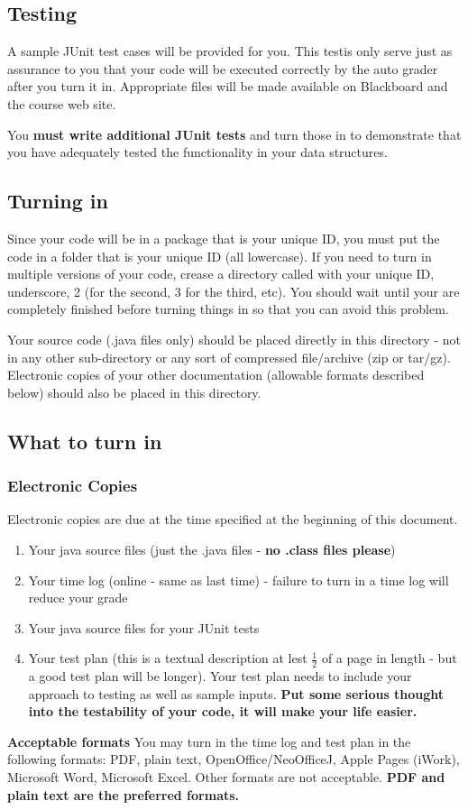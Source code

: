 \documentclass[11pt]{exam}
\begin{document}
\subsection*{Testing}
A sample JUnit test cases will be provided for you.   This testis only serve just as assurance to you that your code will be executed correctly by the auto grader after you turn it in.  Appropriate files will be made available on Blackboard and the course web site. 
\par
You {\bf must write additional JUnit tests} and turn those in to demonstrate that you have adequately tested the functionality in your data structures.

\subsection*{Turning in}
Since your code will be in a package that is your unique ID, you must put the code in a folder that is your unique ID (all lowercase).  If you need to turn in multiple versions of your code, crease a directory called with your unique ID, underscore, 2 (for the second, 3 for the third, etc).   You should wait until your are completely finished before turning things in so that you can avoid this problem.
\par
Your source code (.java files only) should be placed directly in this directory - not in any other sub-directory or any sort of compressed file/archive (zip or tar/gz).   Electronic copies of your other documentation (allowable formats described below) should also be placed in this directory.

\subsection*{What to turn in}
\subsubsection*{Electronic Copies}
Electronic copies are due at the time specified at the beginning of this document.
\begin{enumerate}
   \item Your java source files (just the .java files - {\bf no .class files please})
   \item Your time log (online - same as last time) - failure to turn in a time log will reduce your grade
   \item Your java source files for your JUnit tests
   \item Your test plan (this is a textual description at lest $\frac{1}{2}$ of a page in length - but a good test plan will be longer).  Your test plan needs to include your approach to testing as well as sample inputs.  {\bf Put some serious thought into the testability of your code, it will make your life easier. }
\end{enumerate}
{\bf Acceptable formats} You may turn in the time log and test plan in the following formats: PDF, plain text, OpenOffice/NeoOfficeJ, Apple Pages (iWork), Microsoft Word, Microsoft Excel.  Other formats are not acceptable.   {\bf PDF and plain text are the preferred formats.}
\end{document}
